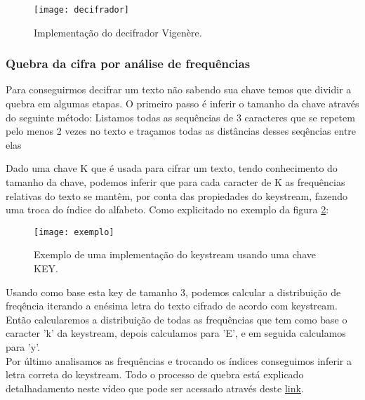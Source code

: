 \documentclass[10pt]{article}
\begin{document}
\begin{figure}[h]
  \texttt{[image: decifrador]}
  \centering
  \caption{Implementação do decifrador Vigenère.}
  \label{fig:decifrador}
\end{figure}

\subsubsection{Quebra da cifra por análise de frequências}

Para conseguirmos decifrar um texto não sabendo sua chave temos que dividir a quebra em algumas etapas.
O primeiro passo é inferir o tamanho da chave através do seguinte método:
Listamos todas as sequências de 3 caracteres que se repetem pelo menos 2 vezes no texto e traçamos todas as distâncias desses 
seqências entre elas


Dado uma chave K que é usada para cifrar um texto, tendo conhecimento do tamanho da chave, podemos inferir que 
para cada caracter de K as frequências relativas do texto se mantêm, por conta das propiedades do keystream,
fazendo uma troca do índice do alfabeto. Como explicitado no exemplo da figura \ref{fig:ex}:

\begin{figure}[h]
  \texttt{[image: exemplo]}
  \centering
  \caption{Exemplo de uma implementação do keystream usando uma chave KEY.}
  \label{fig:ex}
\end{figure}

Usando como base esta key de tamanho 3, podemos calcular a distribuição de freqência iterando a enésima letra do texto cifrado de acordo com
keystream. Então calcularemos a distribuição de todas as frequências que tem como base o caracter 'k' da keystream, depois calculamos para 'E', 
e em seguida calculamos para 'y'.\\
Por último analisamos as frequências e trocando os índices conseguimos inferir a letra correta do keystream.
Todo o processo de quebra está explicado detalhadamento neste vídeo que pode ser acessado através deste \href{https://youtu.be/NIzf1nHWtfs}{link}.
\end{document}
